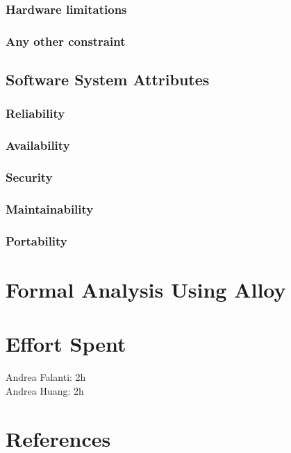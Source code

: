 \documentclass[12pt]{article}
\begin{document}
        \subsubsection{Hardware limitations}
        \subsubsection{Any other constraint}
    \subsection{Software System Attributes}
        \subsubsection{Reliability}
        \subsubsection{Availability}
        \subsubsection{Security}
        \subsubsection{Maintainability}
        \subsubsection{Portability}

\newpage
\section{Formal Analysis Using Alloy}
\section{Effort Spent}
    Andrea Falanti: 2h\\
    Andrea Huang: 2h
\section{References}
\end{document}
